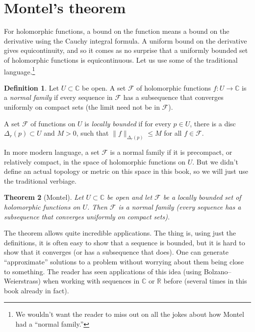 \documentclass[12pt,openany]{book}
\newcommand{\snorm}[1]{\lVert {#1} \rVert}
\newcommand{\C}{{\mathbb{C}}}
\newcommand{\R}{{\mathbb{R}}}
\newcommand{\sF}{{\mathscr{F}}}
\newcommand{\myindex}[1]{#1\index{#1}}
\newcommand{\myquote}[1]{``#1''}
\theoremstyle{plain}
\newtheorem{thm}{Theorem}[section]
\theoremstyle{remark}
\theoremstyle{definition}
\newtheorem{defn}[thm]{Definition}
\theoremstyle{exercise}
\theoremstyle{example}
\begin{document}

\section{Montel's theorem}
\label{sec:montel}

For holomorphic functions, a bound on the function means a
bound on the derivative using the Cauchy integral formula.  A uniform
bound on the derivative gives equicontinuity, and
so it comes as no
surprise that a uniformly bounded set of holomorphic functions
is equicontinuous.
Let us use some of the traditional language.\footnote{%
We wouldn't want the reader to miss out on all the
jokes about how Montel had a \myquote{normal family.}}

\begin{defn}
Let $U \subset \C$ be open.
A set $\sF$ of holomorphic functions $f \colon U \to \C$ is a
\emph{\myindex{normal family}} if every sequence in $\sF$ has a subsequence
that converges uniformly on compact sets (the limit need not be in $\sF$).

A set $\sF$ of functions on $U$ is \emph{\myindex{locally bounded}}
if for every $p \in U$, there is a disc $\Delta_r(p) \subset U$ and $M > 0$,
such that 
$\snorm{f}_{\Delta_r(p)} \leq M$ for all $f \in \sF$.
\end{defn}

In more modern language, a set $\sF$ is a normal family if it is precompact, or
relatively compact, in the space of holomorphic functions on $U$.  But we
didn't define an actual topology or metric on this space in this book, so
we will just use the traditional verbiage.

\begin{thm}[Montel]
Let $U \subset \C$ be open and let $\sF$
be a locally bounded set of holomorphic functions on $U$.
Then $\sF$ is a normal family (every sequence has a subsequence that
converges uniformly on compact sets).
\end{thm}

The theorem allows quite incredible applications.  The thing is,
using just the definitions, it is often easy to show that a sequence is bounded,
but it is hard to show that it converges (or has a subsequence that does).
One can generate \myquote{approximate} solutions to a problem without worrying
about them being close to something.
The reader has seen applications of this idea (using Bolzano--Weierstrass)
when working with sequences in $\C$ or $\R$ before (several times in this
book already in fact).
\end{document}
